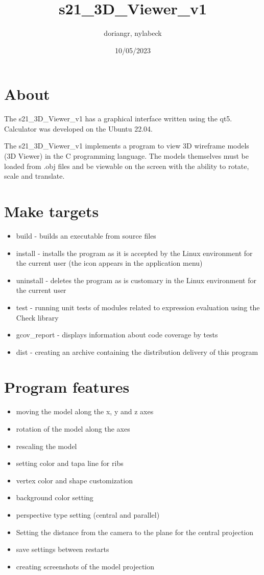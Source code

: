 \documentclass[12pt, a4paper]{article}
\title{s21\_3D\_Viewer\_v1}
\author{doriangr, nylabeck}
\date{10/05/2023}
\begin{document}
\maketitle


\section{About}

The s21\_3D\_Viewer\_v1 has a graphical interface written using the qt5.
Calculator was developed on the Ubuntu 22.04.

The s21\_3D\_Viewer\_v1 implements a program to view 3D wireframe models (3D Viewer) in the C programming language. The models themselves must be loaded from .obj files and be viewable on the screen with the ability to rotate, scale and translate.

\section{Make targets}
\begin{itemize}
    \item build - builds an executable from source files
    \item install - installs the program as it is accepted by the Linux environment for the current user (the icon appears in the application menu)
    \item uninstall - deletes the program as is customary in the Linux environment for the current user
    \item test - running unit tests of modules related to expression evaluation using the Check library
    \item gcov\_report - displays information about code coverage by tests
    \item dist - creating an archive containing the distribution
  delivery of this program
    
  \end{itemize}


\section{Program features}

  \begin{itemize}
    \item moving the model along the x, y and z axes
    \item rotation of the model along the axes
    \item rescaling the model
    \item setting color and tapa line for ribs
    \item vertex color and shape customization
    \item background color setting
    \item perspective type setting (central and parallel)
    \item Setting the distance from the camera to the plane for the central projection
    \item save settings between restarts
    \item creating screenshots of the model projection
  \end{itemize}
\end{document}
